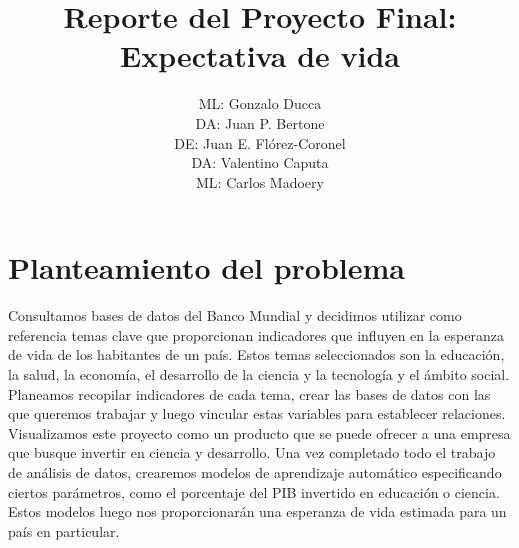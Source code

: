 \documentclass{other/docTemplate}
\author{ML: Gonzalo Ducca \formatemail{gonzaloducca@gmail.com} \\ DA: Juan P. Bertone \formatemail{bertonejpb@gmail.com} \\ DE: Juan E. Flórez-Coronel \formatemail{juan.florez@upr.edu} \\ DA: Valentino Caputa \formatemail{caputavalentino@gmail.com} \\ ML: Carlos Madoery \formatemail{ccmadoery@gmail.com}}
\title{Reporte del Proyecto Final: Expectativa de vida}
\begin{document}
 
\maketitle

\startTable
{}
\stopTable

\tableofcontents
\newpage
\listoftables
\newpage
\listoffigures
\newpage
\printglossary[title=Lista de Acronimos ,type=\acronymtype]
\clearpage




\section{Planteamiento del problema}
Consultamos bases de datos del Banco Mundial y decidimos utilizar como referencia temas clave que proporcionan indicadores que influyen en la esperanza de vida de los habitantes de un país. Estos temas seleccionados son la educación, la salud, la economía, el desarrollo de la ciencia y la tecnología y el ámbito social.
Planeamos recopilar indicadores de cada tema, crear las bases de datos con las que queremos trabajar y luego vincular estas variables para establecer relaciones. Visualizamos este proyecto como un producto que se puede ofrecer a una empresa que busque invertir en ciencia y desarrollo.
Una vez completado todo el trabajo de análisis de datos, crearemos modelos de aprendizaje automático especificando ciertos parámetros, como el porcentaje del PIB invertido en educación o ciencia. Estos modelos luego nos proporcionarán una esperanza de vida estimada para un país en particular.
\end{document}
